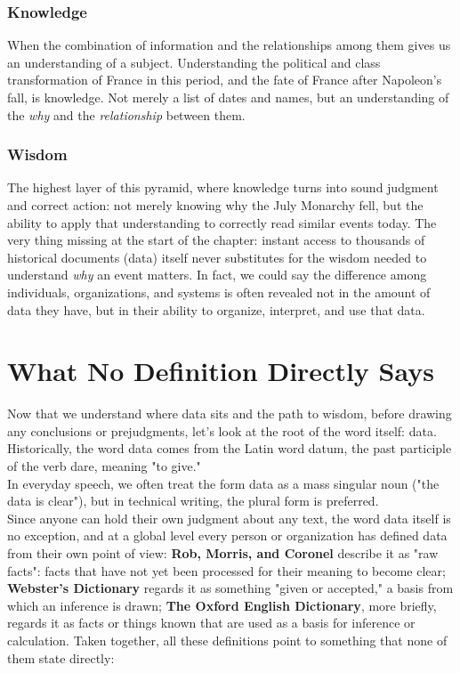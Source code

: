 \subsubsection{Knowledge}
When the combination of information and the relationships among them gives us an understanding of a subject. Understanding the political and class transformation of France in this period, and the fate of France after Napoleon's fall, is knowledge. Not merely a list of dates and names, but an understanding of the \emph{why} and the \emph{relationship} between them.

\subsubsection{Wisdom}
The highest layer of this pyramid, where knowledge turns into sound judgment and correct action: not merely knowing why the July Monarchy fell, but the ability to apply that understanding to correctly read similar events today. The very thing missing at the start of the chapter: instant access to thousands of historical documents (data) itself never substitutes for the wisdom needed to understand \emph{why} an event matters. In fact, we could say the difference among individuals, organizations, and systems is often revealed not in the amount of data they have, but in their ability to organize, interpret, and use that data.

\section{What No Definition Directly Says}
\label{sec:what-no-definition-says}

Now that we understand where data sits and the path to wisdom, before drawing any conclusions or prejudgments, let's look at the root of the word itself: data.\\
Historically, the word data comes from the Latin word datum, the past participle of the verb dare, meaning "to give."\\
In everyday speech, we often treat the form data as a mass singular noun ("the data is clear"), but in technical writing, the plural form is preferred.\\
Since anyone can hold their own judgment about any text, the word data itself is no exception, and at a global level every person or organization has defined data from their own point of view:
\textbf{Rob, Morris, and Coronel} describe it as "raw facts": facts that have not yet been processed for their meaning to become clear;
\textbf{Webster's Dictionary} regards it as something "given or accepted," a basis from which an inference is drawn;
\textbf{The Oxford English Dictionary}, more briefly, regards it as facts or things known that are used as a basis for inference or calculation.
Taken together, all these definitions point to something that none of them state directly:


